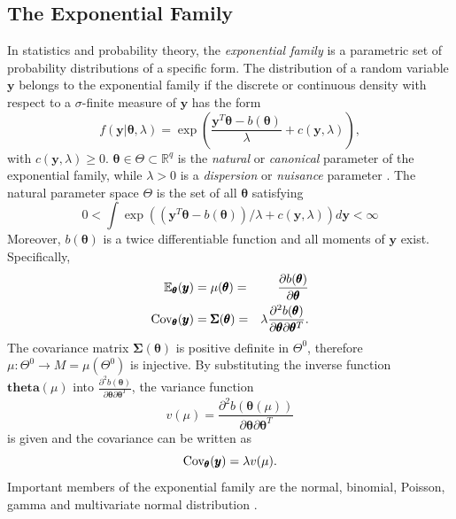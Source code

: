 \subsection{The Exponential Family}
In statistics and probability theory, the \textit{exponential family} is a parametric set of probability distributions of a specific form. The distribution of a random variable $\pmb{y}$ belongs to the exponential family if the discrete or continuous density with respect to a $\sigma$-finite measure of $\pmb{y}$ has the form
\begin{equation}
    f(\pmb{y}|\pmb{\theta}, \lambda)=\exp\left(\frac{\pmb{y}^T\pmb{\theta} - b(\pmb{\theta})}{\lambda}+c(\pmb{y},\lambda) \right),
\end{equation}
with $c(\pmb{y},\lambda)\geq 0$. %
$\pmb{\theta}\in\Theta\subset\mathbb{R}^q$ is the \textit{natural} or \textit{canonical} parameter of the exponential family, while $\lambda > 0$ is a \textit{dispersion} or \textit{nuisance} parameter \autocite[][]{holland1981exponential}. The natural parameter space $\Theta$ is the set of all $\pmb{\theta}$ satisfying
\begin{equation}
    0<\int\exp\left(\left(\pmb{y}^T\pmb{\theta} - b(\pmb{\theta})\right)/\lambda+c(\pmb{y},\lambda) \right)d\pmb{y}< \infty
\end{equation} Moreover, $b(\pmb{\theta})$ is a twice differentiable  function and all moments of $\pmb{y}$ exist. Specifically, 
\begin{alignat}{3}
    \mathbb{E}_{\pmb{\theta}}(\pmb{y}) &= \mu(\pmb{\theta}) =& \frac{\partial b(\pmb{\theta})}{\partial\pmb{\theta}} \\
    \hbox{Cov}_{\pmb{\theta}}(\pmb{y}) &= \pmb{\Sigma}(\pmb{\theta}) =& \lambda\frac{\partial^2b(\pmb{\theta})}{\partial\pmb{\theta}\partial\pmb{\theta}^T}.
\end{alignat}
The covariance matrix $\pmb{\Sigma}(\pmb{\theta})$ is positive definite in $\Theta^0$, therefore $\mu:\Theta^0\rightarrow  M = \mu\left(\Theta^0\right)$ is injective. By substituting the inverse function $\pmb{theta}(\mu)$ into $\frac{\partial^2b(\pmb{\theta})}{\partial\pmb{\theta}\partial\pmb{\theta}^T}$, the variance function 
\begin{equation}
    v(\mu)=\frac{\partial^2b(\pmb{\theta}(\mu))}{\partial\pmb{\theta}\partial\pmb{\theta}^T}
\end{equation}
is given and the covariance can be written as
\begin{equation}
    \hbox{Cov}_{\pmb{\theta}}(\pmb{y}) = \lambda v(\mu).
\end{equation}
Important members of the exponential family are the normal, binomial, Poisson, gamma and multivariate normal distribution \autocite[][433]{fahrmeir2013multivariate}.
